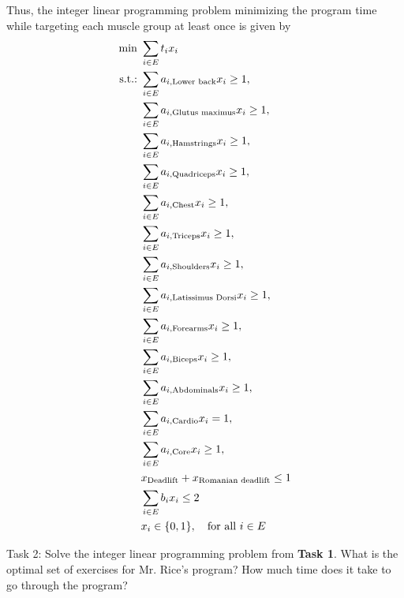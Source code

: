 \documentclass[11pt]{article}
\begin{document}
\begin{description}
{        Thus, the integer linear programming problem minimizing the program time while targeting each muscle group at least once is given by
        \begin{align}
            \min            \ & \sum_{i\in E} t_ix_i\\
            \textup{s.t.:}  \ & \sum_{i\in E} a_{i,\textup{Lower back}}x_i \geq 1,\\
                            \ & \sum_{i\in E} a_{i,\textup{Glutus maximus}}x_i \geq 1,\\
                            \ & \sum_{i\in E} a_{i,\textup{Hamstrings}}x_i \geq 1,\\
                            \ & \sum_{i\in E} a_{i,\textup{Quadriceps}}x_i \geq 1,\\
                            \ & \sum_{i\in E} a_{i,\textup{Chest}}x_i \geq 1,\\
                            \ & \sum_{i\in E} a_{i,\textup{Triceps}}x_i \geq 1,\\
                            \ & \sum_{i\in E} a_{i,\textup{Shoulders}}x_i \geq 1,\\
                            \ & \sum_{i\in E} a_{i,\textup{Latissimus Dorsi}}x_i \geq 1,\\
                            \ & \sum_{i\in E} a_{i,\textup{Forearms}}x_i \geq 1,\\
                            \ & \sum_{i\in E} a_{i,\textup{Biceps}}x_i \geq 1,\\
                            \ & \sum_{i\in E} a_{i,\textup{Abdominals}}x_i \geq 1,\\
                            \ & \sum_{i\in E} a_{i,\textup{Cardio}}x_i = 1,\\
                            \ & \sum_{i\in E} a_{i,\textup{Core}}x_i \geq 1,\\
                            \ & x_{\textup{Deadlift}} + x_{\textup{Romanian deadlift}} \leq 1\\
                            \ &\sum_{i\in E}b_ix_i\leq 2\\
                            \ & x_i\in \{0,1\},\quad \textup{for all }i\in E
        \end{align}
        }
    \fi
    
    \item{Task 2:} Solve the integer linear programming problem from \textbf{Task 1}. What is the optimal set of exercises for Mr. Rice's program? How much time does it take to go through the program?
    

\end{description}
\end{document}
